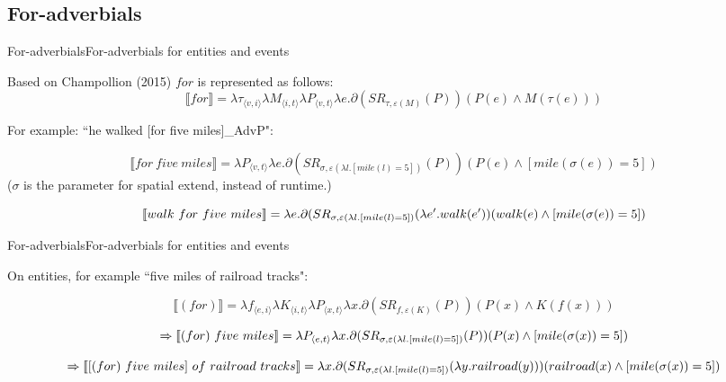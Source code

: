 \documentclass{beamer}
\begin{document}
\subsection{For-adverbials}

\begin{frame}{For-adverbials}{For-adverbials for entities and events}

Based on Champollion (2015) $for$ is represented as follows:
    \[
    \llbracket for \rrbracket = \lambda \tau_{\langle v,i \rangle} \lambda M_{\langle i,t \rangle} \lambda P_{\langle v,t \rangle} \lambda e.\partial(SR_{\tau,\varepsilon(M)}(P))(P(e)\land M(\tau(e)))
    \]
    
    For example: ``he walked [for five miles]_{AdvP}":
    
    \[
    \llbracket for\ five\ miles \rrbracket 
    = \lambda P_{\langle v,t \rangle} \lambda e.\partial(SR_{\sigma,\varepsilon(\lambda l.[mile(l)=5])}(P))(P(e)\land [mile(\sigma(e))=5])
    \] 
    ($\sigma$ is the parameter for spatial extend, instead of runtime.)

    \[
    \llbracket walk\ for\ five\ miles \rrbracket 
    = \\
    \lambda e.\partial(SR_{\sigma,\varepsilon(\lambda l.[mile(l)=5])}(\lambda e'.walk(e'))(walk(e)\land [mile(\sigma(e))=5])
    \] 

\end{frame}

\begin{frame}{For-adverbials}{For-adverbials for entities and events}

On entities, for example ``five miles of railroad tracks":

    \[
    \llbracket (for) \rrbracket = \lambda f_{\langle e,i \rangle} \lambda K_{\langle i,t \rangle} \lambda P_{\langle x,t \rangle} \lambda x.\partial(SR_{f,\varepsilon(K)}(P))(P(x)\land K(f(x)))
    \]
    
    \[
    \Rightarrow \llbracket (for)\ five\ miles \rrbracket 
    = \\
    \lambda P_{\langle e,t \rangle} \lambda x.\partial(SR_{\sigma,\varepsilon(\lambda l.[mile(l)=5])}(P))(P(x)\land [mile(\sigma(x))=5])
    \] 
    

    \[
    \Rightarrow \llbracket [(for)\ five\ miles]\ of\ railroad\ tracks \rrbracket 
    = \\
    \lambda x.\partial(SR_{\sigma,\varepsilon(\lambda l.[mile(l)=5])}(\lambda y.railroad(y)))(railroad(x)\land [mile(\sigma(x))=5])
    \] 

\end{frame}
\end{document}
